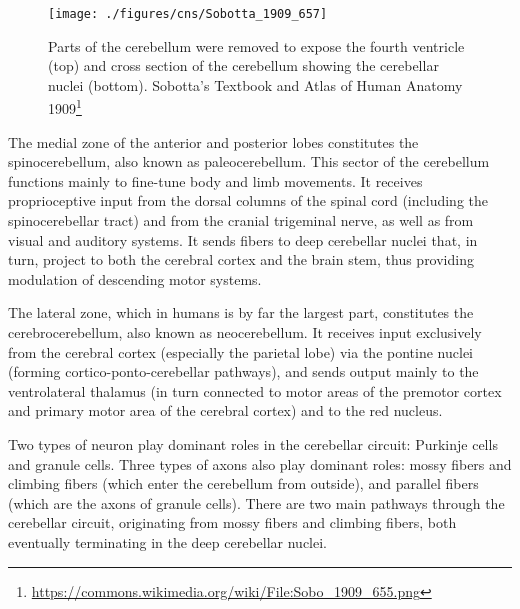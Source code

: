 \documentclass[]{book}
\let\rmarkdownfootnote\footnote%
\def\footnote{\protect\rmarkdownfootnote}
\renewcommand{\href}[2]{#2\footnote{\url{#1}}}
\begin{document}
\begin{figure}

{\centering \texttt{[image: ./figures/cns/Sobotta\_1909\_657]} 

}

\caption{Parts of the cerebellum were removed to expose the fourth ventricle (top) and cross section of the cerebellum showing the cerebellar nuclei (bottom). \href{https://commons.wikimedia.org/wiki/File:Sobo_1909_655.png}{Sobotta's Textbook and Atlas of Human Anatomy 1909}}\label{fig:cerebellumcut}
\end{figure}

The medial zone of the anterior and posterior lobes constitutes the spinocerebellum, also known as paleocerebellum. This sector of the cerebellum functions mainly to fine-tune body and limb movements. It receives proprioceptive input from the dorsal columns of the spinal cord (including the spinocerebellar tract) and from the cranial trigeminal nerve, as well as from visual and auditory systems. It sends fibers to deep cerebellar nuclei that, in turn, project to both the cerebral cortex and the brain stem, thus providing modulation of descending motor systems.

The lateral zone, which in humans is by far the largest part, constitutes the cerebrocerebellum, also known as neocerebellum. It receives input exclusively from the cerebral cortex (especially the parietal lobe) via the pontine nuclei (forming cortico-ponto-cerebellar pathways), and sends output mainly to the ventrolateral thalamus (in turn connected to motor areas of the premotor cortex and primary motor area of the cerebral cortex) and to the red nucleus.

Two types of neuron play dominant roles in the cerebellar circuit: Purkinje cells and granule cells. Three types of axons also play dominant roles: mossy fibers and climbing fibers (which enter the cerebellum from outside), and parallel fibers (which are the axons of granule cells). There are two main pathways through the cerebellar circuit, originating from mossy fibers and climbing fibers, both eventually terminating in the deep cerebellar nuclei.
\end{document}
